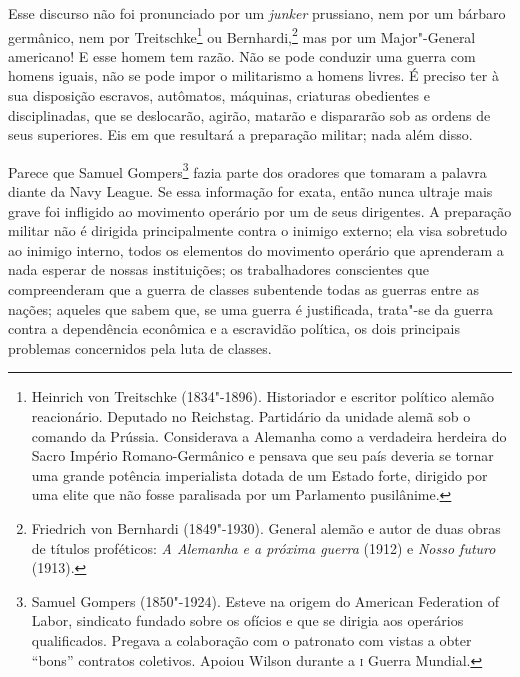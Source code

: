 Esse discurso não foi pronunciado por um \textit{junker} prussiano, nem por um
bárbaro germânico, nem por Treitschke\footnote{
Heinrich von Treitschke (1834"-1896). Historiador e escritor político alemão
reacionário. Deputado no Reichstag. Partidário da unidade alemã sob o
comando da Prússia. Considerava a Alemanha como a verdadeira herdeira
do Sacro Império Romano-Germânico e pensava que seu país deveria se
tornar uma grande potência imperialista dotada de um Estado forte,
dirigido por uma elite que não fosse paralisada por um Parlamento
pusilânime.} ou Bernhardi,\footnote{
Friedrich von Bernhardi (1849"-1930). General alemão e autor de duas
obras de títulos proféticos: \textit{A Alemanha e a próxima guerra} (1912) e
\textit{Nosso futuro} (1913).} mas por um Major"-General 
americano! E esse homem tem razão. Não se pode conduzir uma
guerra com homens iguais, não se pode impor o militarismo a homens
livres. É preciso ter à sua disposição escravos, autômatos, máquinas,
criaturas obedientes e disciplinadas, que se deslocarão, agirão,
matarão e dispararão sob as ordens de seus superiores. Eis em que
resultará a preparação militar; nada além disso.

Parece que Samuel Gompers\footnote{
Samuel Gompers (1850"-1924). Esteve na origem do American Federation of
Labor, sindicato fundado sobre os ofícios e que se dirigia aos operários
qualificados. Pregava a colaboração com o patronato com vistas a obter
“bons” contratos coletivos. Apoiou Wilson durante a \textsc{i} Guerra Mundial.}
fazia parte dos oradores que tomaram a
palavra diante da Navy League. Se essa informação for exata, então
nunca ultraje mais grave foi infligido ao movimento operário por um de
seus dirigentes. A preparação militar não é dirigida principalmente
contra o inimigo externo; ela visa sobretudo ao inimigo interno, todos
os elementos do movimento operário que aprenderam a nada esperar de
nossas instituições; os trabalhadores conscientes que compreenderam que
a guerra de classes subentende todas as guerras entre as nações;
aqueles que sabem que, se uma guerra é justificada, trata"-se da
guerra contra a dependência econômica e a escravidão política, os dois
principais problemas concernidos pela luta de classes.

